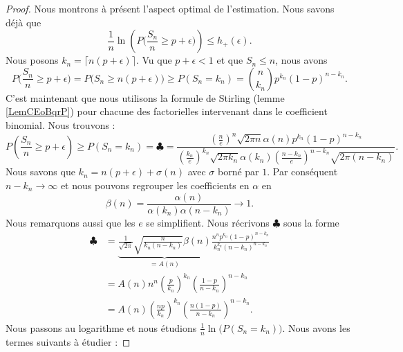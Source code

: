 \begin{proof}
    Nous montrons à présent l'aspect optimal de l'estimation. Nous savons déjà que
    \begin{equation}    \label{EqUIplgUD}
        \frac{1}{ n }\ln\left( P\big( \frac{ S_n }{ n }\geq p+\epsilon \big) \right)\leq h_+(\epsilon).
    \end{equation}
    Nous posons \( k_n=\lceil n(p+\epsilon)\rceil\). Vu que \( p+\epsilon<1\) et que \( S_n\leq n\), nous avons
    \begin{equation}
        P\big( \frac{ S_n }{ n }\geq p+\epsilon \big)=P\big( S_n\geq n(p+\epsilon) \big)\geq P(S_n=k_n)=\binom{ n }{ k_n }p^{k_n}(1-p)^{n-k_n}.
    \end{equation}
    C'est maintenant que nous utilisons la formule de Stirling (lemme \ref{LemCEoBqrP}) pour chacune des factorielles intervenant dans le coefficient binomial. Nous trouvons :
    \begin{equation}
        P\left( \frac{ S_n }{ n }\geq p+\epsilon \right)\geq P(S_n=k_n)=  \clubsuit= \frac{ \left( \frac{ n }{ e } \right)^n\sqrt{2\pi n}\alpha(n)p^{k_n}(1-p)^{n-k_n} }{ \left( \frac{ k_n }{ e } \right)^{k_n}\sqrt{2\pi k_n}\alpha(k_n)\left( \frac{ n-k_n }{ e } \right)^{n-k_n}\sqrt{2\pi(n-k_n)} }.
    \end{equation}
    Nous savons que \( k_n=n(p+\epsilon)+\sigma(n)\) avec \( \sigma\) borné par \( 1\). Par conséquent \( n-k_n\to \infty\) et nous pouvons regrouper les coefficients en \( \alpha\) en
    \begin{equation}
        \beta(n)=\frac{ \alpha(n) }{ \alpha(k_n)\alpha(n-k_n) }\to 1.
    \end{equation}
    Nous remarquons aussi que les \( e\) se simplifient. Nous récrivons \( \clubsuit\) sous la forme
    \begin{subequations}
        \begin{align}
            \clubsuit&=\underbrace{\frac{1}{ \sqrt{2\pi} }\sqrt{\frac{ n }{ k_n(n-k_n) }}\beta(n) }_{=A(n)}  \frac{ n^np^{k_n}(1-p)^{n-k_n} }{ k_n^{k_n}(n-k_n)^{n-k_n} }\\
            &=A(n)n^n\left( \frac{ p }{ k_n } \right)^{k_n}\left( \frac{ 1-p }{ n-k_n } \right)^{n-k_n}\\
            &=A(n)\left( \frac{ np }{ k_n } \right)^{k_n}\left( \frac{ n(1-p) }{ n-k_n } \right)^{n-k_n}.
        \end{align}
    \end{subequations}
    Nous passons au logarithme et nous étudions \( \frac{1}{ n }\ln\big( P(S_n=k_n) \big)\). Nous avons les termes suivants à étudier :

\end{proof}
